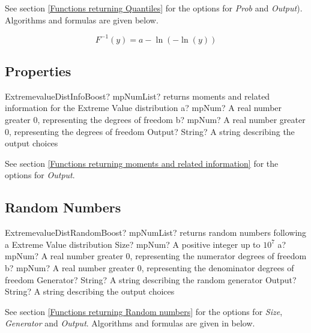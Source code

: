 See section \ref{Functions returning Quantiles} for the options for  {\itshape\sffamily Prob} and {\itshape\sffamily Output}). Algorithms and formulas are given below.

\begin{equation} 
	F^{-1}(y)= a-\ln(-\ln(y))
\end{equation}


\subsection{Properties}
\label{ExtremevalueDistributionProperties}


\begin{mpFunctionsExtract}
	\mpFunctionThree
	{ExtremevalueDistInfoBoost? mpNumList? returns moments and related information for the Extreme Value distribution}
	{a? mpNum? A real number greater 0, representing the degrees of freedom}
	{b? mpNum? A real number greater 0, representing the degrees of freedom}
	{Output? String? A string describing the output choices}
\end{mpFunctionsExtract}

\vspace{0.3cm}

See section \ref{Functions returning moments and related information} for the options for {\itshape\sffamily Output}. 




\subsection{Random Numbers}

\begin{mpFunctionsExtract}
	\mpFunctionFive
	{ExtremevalueDistRandomBoost? mpNumList? returns random numbers following a Extreme Value distribution}
	{Size? mpNum? A positive integer up to $10^7$}
	{a? mpNum? A real number greater 0, representing the numerator  degrees of freedom}
	{b? mpNum? A real number greater 0, representing the denominator degrees of freedom}
	{Generator? String? A string describing the random generator}
	{Output? String? A string describing the output choices}
\end{mpFunctionsExtract}

\vspace{0.3cm}

See section \ref{Functions returning Random numbers} for the options for  {\itshape\sffamily Size},  {\itshape\sffamily Generator} and {\itshape\sffamily Output}. Algorithms and formulas are given in below.





